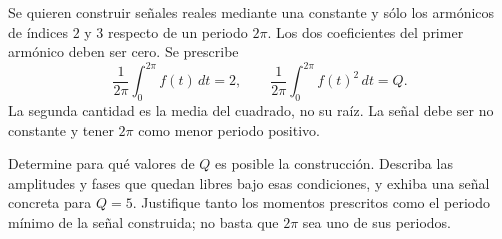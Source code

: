 Se quieren construir señales reales mediante una constante y sólo los armónicos de índices \(2\) y \(3\) respecto de un periodo \(2\pi\). Los dos coeficientes del primer armónico deben ser cero. Se prescribe
\[
\frac1{2\pi}\int_0^{2\pi}f(t)\,dt=2,
\qquad
\frac1{2\pi}\int_0^{2\pi}f(t)^2\,dt=Q.
\]
La segunda cantidad es la media del cuadrado, no su raíz. La señal debe ser no constante y tener \(2\pi\) como menor periodo positivo.

Determine para qué valores de \(Q\) es posible la construcción. Describa las amplitudes y fases que quedan libres bajo esas condiciones, y exhiba una señal concreta para \(Q=5\). Justifique tanto los momentos prescritos como el periodo mínimo de la señal construida; no basta que \(2\pi\) sea uno de sus periodos.
